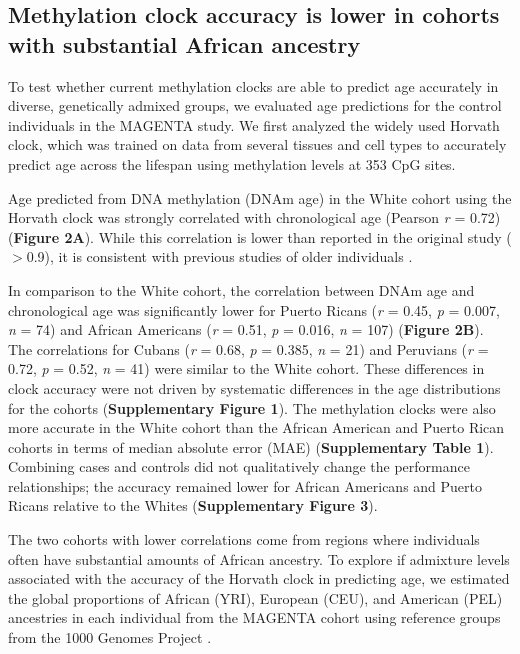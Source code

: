 \subsection{Methylation clock accuracy is lower in cohorts with substantial African ancestry}
To test whether current methylation clocks are able to predict age accurately in diverse, genetically admixed groups, we evaluated age predictions for the control individuals in the MAGENTA study. We first analyzed the widely used Horvath clock, which was trained on data from several tissues and cell types to accurately predict age across the lifespan using methylation levels at 353 CpG sites.

Age predicted from DNA methylation (DNAm age) in the White cohort using the Horvath clock was strongly correlated with chronological age (Pearson \textit{r} = 0.72) (\textbf{Figure 2A}). While this correlation is lower than reported in the original study ($>$0.9), it is consistent with previous studies of older individuals \citep{horvath_dna_2013, marioni_dna_2015}.

\correlationsancestry

In comparison to the White cohort, the correlation between DNAm age and chronological age was significantly lower for Puerto Ricans (\textit{r} = 0.45, \textit{p} = 0.007, \textit{n} = 74) and African Americans (\textit{r} = 0.51, \textit{p} = 0.016, \textit{n} = 107) (\textbf{Figure 2B}). The correlations for Cubans (\textit{r} = 0.68, \textit{ p} = 0.385, \textit{n} = 21) and Peruvians (\textit{r} = 0.72, \textit{p} = 0.52, \textit{n} = 41) were similar to the White cohort. These differences in clock accuracy were not driven by systematic differences in the age distributions for the cohorts (\textbf{Supplementary Figure 1}). The methylation clocks were also more accurate in the White cohort than the African American and Puerto Rican cohorts in terms of median absolute error (MAE) (\textbf{Supplementary Table 1}). Combining cases and controls did not qualitatively change the performance relationships; the accuracy remained lower for African Americans and Puerto Ricans relative to the Whites (\textbf{Supplementary Figure 3}).

The two cohorts with lower correlations come from regions where individuals often have substantial amounts of African ancestry. To explore if admixture levels associated with the accuracy of the Horvath clock in predicting age, we estimated the global proportions of African (YRI), European (CEU), and American (PEL) ancestries in each individual from the MAGENTA cohort using reference groups from the 1000 Genomes Project \citep{the_1000_genomes_project_consortium_global_2015}. 

